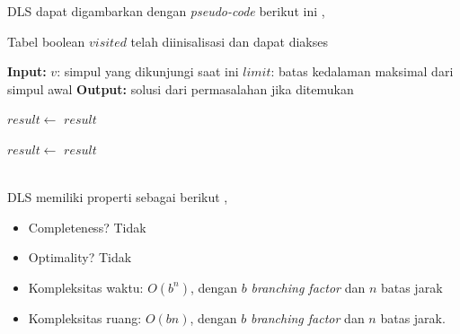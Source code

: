 \documentclass[12pt,a4paper]{article}
\begin{document}
DLS dapat digambarkan dengan \textit{pseudo-code} berikut ini \cite{stima-graph-2},
\begin{algorithm}[H]
    \caption{Mengunjungi seluruh simpul graf dengan DLS} \label{alg:dls}
    \begin{algorithmic}
        \Require Tabel boolean $visited$ telah diinisalisasi dan dapat diakses
        \Statex

            \State \textbf{Input:} \; $v$: simpul yang dikunjungi saat ini
            \State \qquad \qquad $limit$: batas kedalaman maksimal dari simpul awal
            \State \textbf{Output:} solusi dari permasalahan jika ditemukan
            \Statex

            \State $result \gets $  
                \State \Return $result$
            \EndIf

            \Statex

                    \State $result \gets $ 
                        \State \Return $result$
                    \EndIf
                \EndIf
            \EndFor

        \EndFunction
    \end{algorithmic}
\end{algorithm} \\

DLS memiliki properti sebagai berikut \cite{stima-graph-2}, 
\begin{itemize}
    \item Completeness? Tidak
    \item Optimality? Tidak
    \item Kompleksitas waktu: $O(b^n)$, dengan $b$ \textit{branching factor} dan $n$ batas jarak
    \item Kompleksitas ruang: $O(bn)$, dengan $b$ \textit{branching factor} dan $n$ batas jarak.
\end{itemize} \\
\end{document}
